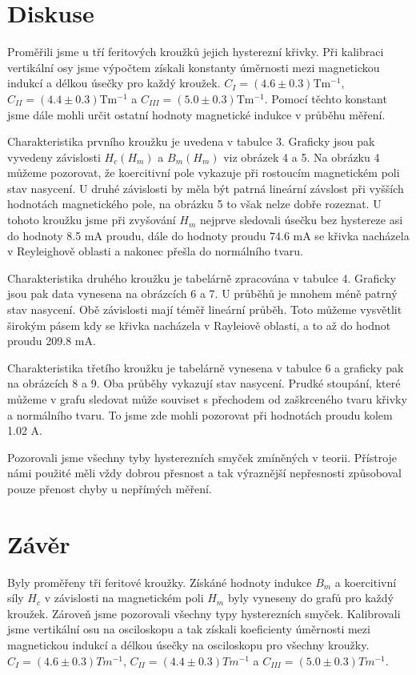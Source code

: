 \documentclass{article}
\begin{document}
\section{Diskuse}
\par  Proměřili jsme u tří feritových kroužků jejich hysterezní křivky. Při kalibraci vertikální osy jsme výpočtem získali konstanty úměrnosti mezi magnetickou indukcí a délkou úsečky pro každý kroužek. $C_{I} = (4.6 \pm 0.3)\mathrm{Tm^{-1}}$, $C_{II} = (4.4 \pm 0.3)\mathrm{Tm^{-1}}$ a $C_{III} = (5.0 \pm 0.3)\mathrm{Tm^{-1}}$. Pomocí těchto konstant jsme dále mohli určit ostatní hodnoty magnetické indukce v průběhu měření. 
\par Charakteristika prvního kroužku je uvedena v tabulce 3. Graficky jsou pak vyvedeny závislosti $H_c(H_m)$ a $B_m(H_m)$ viz obrázek 4 a 5. Na obrázku 4 můžeme pozorovat, že koercitivní pole vykazuje při rostoucím magnetickém poli stav nasycení. U druhé závislosti by měla být patrná lineární závslost při vyšších hodnotách magnetického pole, na obrázku 5 to však nelze dobře rozeznat. U tohoto kroužku jsme při zvyšování $H_m$ nejprve sledovali úsečku bez hystereze asi do hodnoty 8.5 mA proudu, dále do hodnoty proudu 74.6 mA se křivka nacházela v Reyleighově oblasti a nakonec přešla do normálního tvaru.
\par Charakteristika druhého kroužku je tabelárně zpracována v tabulce 4. Graficky jsou pak data vynesena na obrázcích 6 a 7. U průběhů je mnohem méně patrný stav nasycení. Obě závislosti mají téměř lineární průběh. Toto můžeme vysvětlit širokým pásem kdy se křivka nacházela v Rayleiově oblasti, a to až do hodnot proudu 209.8 mA. 
\par Charakteristika třetího kroužku je tabelárně vynesena v tabulce 6 a graficky pak na obrázcích 8 a 9. Oba průběhy vykazují stav nasycení. Prudké stoupání, které můžeme v grafu sledovat může souviset s přechodem od zaškrceného tvaru křivky a normálního tvaru. To jsme zde mohli pozorovat při hodnotách proudu kolem 1.02 A. 
\par Pozorovali jsme všechny tyby hysterezních smyček zmíněných v teorii. Přístroje námi použité měli vždy dobrou přesnost a tak výraznější nepřesnosti způsoboval pouze přenost chyby u nepřímých měření. 



\section{Závěr}
\par Byly proměřeny tři feritové kroužky. Získáné hodnoty indukce $B_m$ a koercitivní síly $H_c$ v závislosti na magnetickém poli $H_m$ byly vyneseny do grafů pro každý kroužek. Zároveň jsme pozorovali všechny typy hysterezních smyček. Kalibrovali jsme vertikální osu na osciloskopu a tak získali koeficienty úměrnosti mezi magnetickou indukcí a délkou úsečky na osciloskopu pro všechny kroužky. $C_{I} = (4.6 \pm 0.3)Tm^{-1}$, $C_{II} = (4.4 \pm 0.3)Tm^{-1}$ a $C_{III} = (5.0 \pm 0.3)Tm^{-1}$.  
\end{document}
